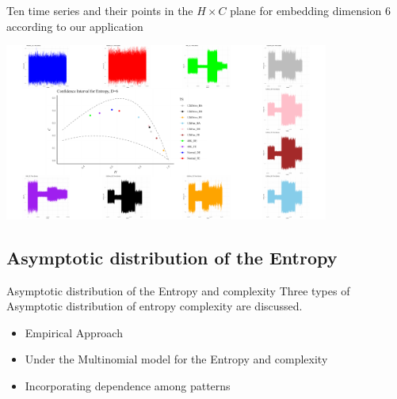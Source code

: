 \documentclass{beamer}
\begin{document}
\begin{frame}{Ten time series and their points in the $H \times C$ plane for embedding dimension 6 according to our application}
	\begin{center}
		\includegraphics[width=0.8\textwidth]{combined plot}
	\end{center}
	
\end{frame}


\subsection{Asymptotic distribution of the Entropy}

\begin{frame}{Asymptotic distribution of the Entropy and complexity}
	Three types of Asymptotic distribution of entropy complexity are discussed.
	\begin{itemize}
		\item Empirical Approach
		\item Under the Multinomial model for the Entropy and complexity
		\item Incorporating dependence among patterns
	\end{itemize}
\end{frame}
\end{document}
